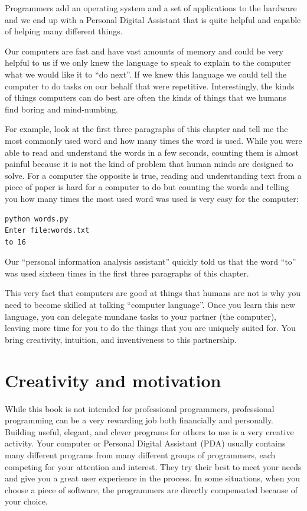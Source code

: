 \documentclass[11pt]{book}
\begin{document}
Programmers add an operating system and a set of applications
to the hardware and we end up with a Personal Digital
Assistant that is quite helpful and capable of helping
many different things.

Our computers are fast and have vast amounts of memory and 
could be very helpful to us if we only knew the language to
speak to explain to the computer what we would like it to 
``do next''.  If we knew this language we could tell the 
computer to do tasks on our behalf that were repetitive.  
Interestingly, the kinds of things computers can do best
are often the kinds of things that we humans find boring
and mind-numbing.

For example, look at the first three paragraphs of this
chapter and tell me the most commonly used word and how
many times the word is used.  While you were able to read
and understand the words in a few seconds, counting them
is almost painful because it is not the kind of problem 
that human minds are designed to solve.  For a computer
the opposite is true, reading and understanding text 
from a piece of paper is hard for a computer to do 
but counting the words and telling you how many times
the most used word was used is very easy for the
computer:

\beforeverb
\begin{verbatim}
python words.py
Enter file:words.txt
to 16
\end{verbatim}
\afterverb
%
Our ``personal information analysis assistant'' quickly 
told us that the word ``to'' was used sixteen times in the
first three paragraphs of this chapter.

This very fact that computers are good at things 
that humans are not is why you need to become
skilled at talking ``computer language''.  Once you learn
this new language, you can delegate mundane tasks
to your partner (the computer), leaving more time 
for you to do the 
things that you are uniquely suited for.  You bring 
creativity, intuition, and inventiveness to this
partnership.  

\section{Creativity and motivation}

While this book is not intended for professional programmers, professional
programming can be a very rewarding job both financially and personally.
Building useful, elegant, and clever programs for others to use is a very
creative activity.  Your computer or Personal Digital Assistant (PDA) 
usually contains many different programs from many different groups of 
programmers, each competing for your attention and interest.  They try 
their best to meet your needs and give you a great user experience in the
process.   In some situations, when you choose a piece of software, the 
programmers are directly compensated because of your choice.
\end{document}
